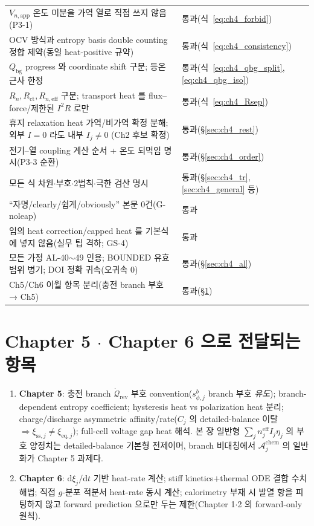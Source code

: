 \documentclass[11pt,a4paper]{article}
\newcommand{\dd}{\mathrm{d}}
\newcommand{\eff}{\mathrm{eff}}
\newcommand{\eq}{\mathrm{eq}}
\newcommand{\app}{\mathrm{app}}
\newcommand{\bg}{\mathrm{bg}}
\newcommand{\rev}{\mathrm{rev}}
\newcommand{\ct}{\mathrm{ct}}
\newcommand{\chem}{\mathrm{chem}}
\newcommand{\sstat}{\mathrm{ss}}
\begin{document}
{\begin{longtable}{>{\raggedright\arraybackslash}p{} >{\raggedright\arraybackslash}p{}}
$V_{n,\app}$ 온도 미분을 가역 열로 직접 쓰지 않음(P3-1) & 통과(식~\eqref{eq:ch4_forbid}) \\
OCV 방식과 entropy basis double counting 정합 제약(동일 heat-positive 규약) & 통과(식~\eqref{eq:ch4_consistency}) \\
$Q_\bg$ progress 와 coordinate shift 구분; 등온 근사 한정 & 통과(식~\eqref{eq:ch4_qbg_split},\eqref{eq:ch4_qbg_iso}) \\
$R_n,R_\ct,R_{n,\eff}$ 구분; transport heat 를 flux--force/제한된 $I^2R$ 로만 & 통과(식~\eqref{eq:ch4_Rsep}) \\
휴지 relaxation heat 가역/비가역 확정 분해; 외부 $I{=}0$ 라도 내부 $I_j{\ne}0$ (Ch2 후보 확정) & 통과(\S\ref{sec:ch4_rest}) \\
전기--열 coupling 계산 순서 + 온도 되먹임 명시(P3-3 순환) & 통과(\S\ref{sec:ch4_order}) \\
모든 식 차원$\cdot$부호$\cdot$2법칙$\cdot$극한 검산 명시 & 통과(\S\ref{sec:ch4_tr},\ref{sec:ch4_general} 등) \\
``자명/clearly/쉽게/obviously'' 본문 0건(G-noleap) & 통과 \\
임의 heat correction/capped heat 를 기본식에 넣지 않음(실무 팁 격하; GS-4) & 통과 \\
모든 가정 AL-40$\sim$49 인용; BOUNDED 유효범위 병기; DOI 정확 귀속(오귀속 0) & 통과(\S\ref{sec:ch4_al}) \\
Ch5/Ch6 이월 항목 분리(충전 branch 부호 → Ch5) & 통과(\S\ref{sec:ch4_transmit}) \\
\bottomrule
\end{longtable}
}

\section{Chapter 5 $\cdot$ Chapter 6 으로 전달되는 항목}\label{sec:ch4_transmit}
\begin{enumerate}[label=\arabic*),leftmargin=2.0em]
\item \textbf{Chapter 5}: 충전 branch $\dot{\mathcal Q}_{\rev}$ 부호 convention($s_{\phi,j}^b$ branch 부호
  \emph{유도}); branch-dependent entropy coefficient; hysteresis heat vs polarization heat 분리;
  charge/discharge asymmetric affinity/rate($C_j$ 의 detailed-balance 이탈 $\Rightarrow\xi_{\sstat,j}\ne\xi_{\eq,j}$);
  full-cell voltage gap heat 해석. 본 장 일반형 $\sum_j n_j^{\eff}I_j\eta_j$ 의 부호 양정치는 detailed-balance
  기본형 전제이며, branch 비대칭에서 $\mathcal A_j^{\chem}$ 의 일반화가 Chapter 5 과제다.
\item \textbf{Chapter 6}: $\dd\xi_j/\dd t$ 기반 heat-rate 계산; stiff kinetics$+$thermal ODE 결합 수치 해법;
  직접 $g$-분포 적분서 heat-rate 동시 계산; calorimetry 부재 시 발열 항을 피팅하지 않고 forward prediction
  으로만 두는 제한(Chapter 1$\cdot$2 의 forward-only 원칙).
\end{enumerate}
\end{document}
